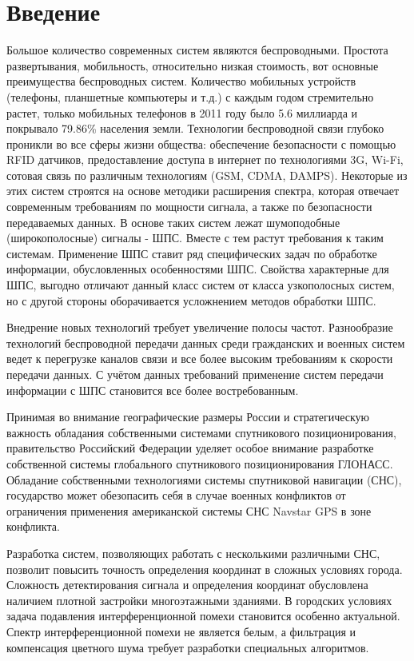 \chapter*{Введение}

Большое количество современных систем являются беспроводными. Простота развертывания, мобильность, относительно низкая
стоимость, вот основные преимущества беспроводных систем. Количество мобильных устройств (телефоны, планшетные компьютеры
и т.д.) с каждым годом стремительно растет, только мобильных телефонов в 2011 году было 5.6 миллиарда и покрывало 79.86\%
\cite{wiki_mobilenum} населения земли. Технологии беспроводной связи глубоко проникли во все сферы жизни общества:
обеспечение безопасности с помощью RFID датчиков, предоставление доступа в интернет по технологиями 3G, Wi-Fi, 
сотовая связь по различным технологиям (GSM, CDMA, DAMPS). Некоторые из этих систем строятся на основе методики
расширения спектра, которая отвечает современным требованиям по мощности сигнала, а также по безопасности передаваемых
данных. В основе таких систем лежат шумоподобные (широкополосные) сигналы - ШПС. Вместе с тем растут требования к таким
системам. Применение ШПС ставит ряд специфических задач по обработке информации, обусловленных особенностями ШПС.
Свойства характерные для ШПС, выгодно отличают данный класс систем от класса узкополосных систем, но с другой стороны
оборачивается усложнением методов обработки ШПС.

Внедрение новых технологий требует увеличение полосы частот. Разнообразие технологий беспроводной передачи данных среди
гражданских и военных систем ведет к перегрузке каналов связи и все более высоким требованиям к скорости передачи
данных. С учётом данных требований применение систем передачи информации с ШПС становится все более востребованным.

Принимая во внимание географические размеры России и стратегическую важность обладания собственными системами спутникового
позиционирования, правительство Российский Федерации уделяет особое внимание разработке собственной системы
глобального спутникового позиционирования ГЛОНАСС. Обладание собственными технологиями системы спутниковой навигации (СНС), государство может обезопасить
себя в случае военных конфликтов от ограничения применения американской системы СНС Navstar GPS в зоне конфликта.

Разработка систем, позволяющих работать с несколькими различными СНС, позволит повысить точность определения координат
в сложных условиях города. Сложность детектирования сигнала и определения координат обусловлена наличием плотной
застройки многоэтажными зданиями. В городских условиях задача подавления интерференционной помехи становится особенно
актуальной. Спектр интерференционной помехи не является белым, а фильтрация и компенсация цветного шума
требует разработки специальных алгоритмов.

